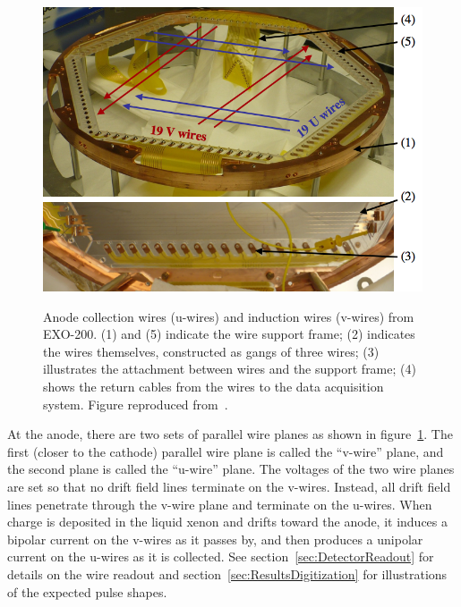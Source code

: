 \begin{figure}
\begin{center}
\includegraphics[keepaspectratio=true,width=\textwidth]{supportwithoutwires.png}
\end{center}
\renewcommand{\baselinestretch}{1}
\small\normalsize
\begin{quote}
\caption{Anode collection wires (u-wires) and induction wires (v-wires) from EXO-200.  (1) and (5) indicate the wire support frame; (2) indicates the wires themselves, constructed as gangs of three wires; (3) illustrates the attachment between wires and the support frame; (4) shows the return cables from the wires to the data acquisition system.  Figure reproduced from~\cite{detectorPartI}.}
\label{fig:UandVWiresCrossing}
\end{quote}
\end{figure}
\renewcommand{\baselinestretch}{2}
\small\normalsize

At the anode, there are two sets of parallel wire planes as shown in figure~\ref{fig:UandVWiresCrossing}.  The first (closer to the cathode) parallel wire plane is called the ``v-wire'' plane, and the second plane is called the ``u-wire'' plane.  The voltages of the two wire planes are set so that no drift field lines terminate on the v-wires. Instead, all drift field lines penetrate through the v-wire plane and terminate on the u-wires.  When charge is deposited in the liquid xenon and drifts toward the anode, it induces a bipolar current on the v-wires as it passes by, and then produces a unipolar current on the u-wires as it is collected.  See section~\ref{sec:DetectorReadout} for details on the wire readout and section~\ref{sec:ResultsDigitization} for illustrations of the expected pulse shapes.

